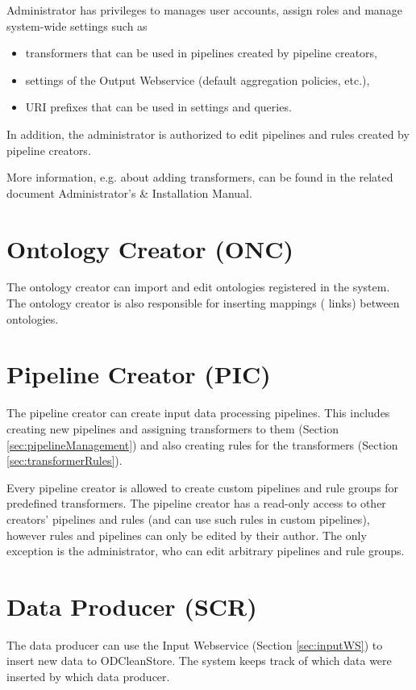 	Administrator has privileges to manages user accounts, assign roles and manage system-wide settings such as
	\begin{itemize}
		\item transformers that can be used in pipelines created by pipeline creators,
		\item settings of the Output Webservice (default aggregation policies, etc.),
		\item URI prefixes that can be used in settings and queries.
	\end{itemize}

	In addition, the administrator is authorized to edit pipelines and rules created by pipeline creators.

	More information, e.g. about adding transformers, can be found in the related document Administrator's \& Installation Manual.

\section[Ontology Creator]{Ontology Creator (ONC)}
	The ontology creator can import and edit ontologies registered in the system. The ontology creator is also responsible for inserting mappings ( links) between ontologies.

\section[Pipeline Creator]{Pipeline Creator (PIC)}
	The pipeline creator can create input data processing pipelines. This includes creating new pipelines and assigning transformers to them (Section \ref{sec:pipelineManagement}) and also creating rules for the transformers (Section \ref{sec:transformerRules}).

	Every pipeline creator is allowed to create custom pipelines and rule groups for predefined transformers. The pipeline creator has a read-only access to other creators' pipelines and rules (and can use such rules in custom pipelines), however rules and pipelines can only be edited by their author. The only exception is the administrator, who can edit arbitrary pipelines and rule groups.
	
\section[Data Producer]{Data Producer (SCR)} 
  The data producer can use the Input Webservice (Section \ref{sec:inputWS}) to insert new data to ODCleanStore. The system keeps track of which data were inserted by which data producer.

